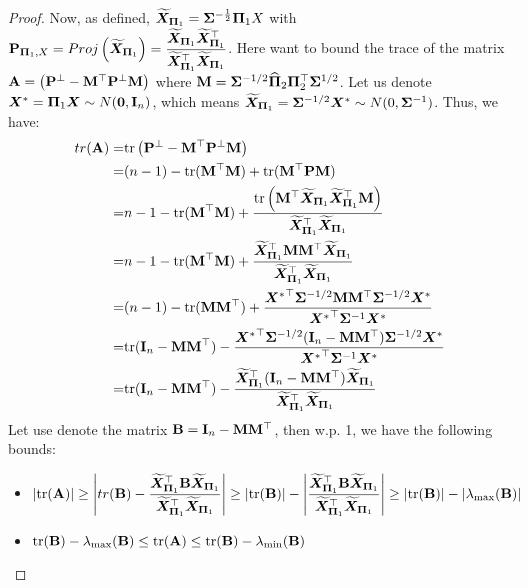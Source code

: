 \documentclass[numsec,webpdf,modern,medium,namedate]{oup-authoring-template}
\theoremstyle{thmstyleone}%
\theoremstyle{thmstyletwo}%
\theoremstyle{thmstylethree}%
\begin{document}
\begin{proof}
Now, as defined, $\widetilde{\bX}_{\bPi_1} = {\bSig}^{-\frac{1}{2}}\bPi_1X$ with $\bP_{\bPi_1, X} = Proj\left(\widetilde{\bX}_{\bPi_1}\right) = \dfrac{\widetilde{\bX}_{\bPi_1}\widetilde{\bX}_{\bPi_1}^\top}{\widetilde{\bX}_{\bPi_1}^\top \widetilde{\bX}_{\bPi_1}}$. Here want to bound the trace of the matrix $\bA = \left(\bP^\perp - \bM^\top \bP^\perp \bM \right)$ where $\bM = {\bSig}^{-1/2} \hatPi_2 {\bPi}_2^\top {\bSig}^{1/2}$. Let us denote $\bX^\ast = \bPi_1\bX\sim N(\bzero,\bI_n)$, which means $\widetilde{\bX}_{\bPi_1} = {\bSig}^{-1/2}\bX^\ast \sim N(0, \Siginv)$. Thus, we have:
\begin{equation*}
    \begin{split}
        tr(\bA) = & \tr\left(\bP^\perp - \bM^\top \bP^\perp \bM \right)\\
        = & (n-1) - \tr(\bM^\top\bM) + \tr(\bM^\top\bP\bM)\\
        = & n-1 - \tr(\bM^\top\bM) +\dfrac{\tr\left(\bM^\top\widetilde{\bX}_{\bPi_1}\widetilde{\bX}_{\bPi_1}^\top \bM\right)}{\widetilde{\bX}_{\bPi_1}^\top \widetilde{\bX}_{\bPi_1}}\\
        = & n-1 - \tr(\bM^\top\bM)+ \dfrac{\widetilde{\bX}_{\bPi_1}^\top \bM \bM^\top\widetilde{\bX}_{\bPi_1}}{\widetilde{\bX}_{\bPi_1}^\top \widetilde{\bX}_{\bPi_1}}\\
        = & (n-1) - \tr(\bM\bM^\top)+ \dfrac{{\bX^\ast}^\top{\bSig}^{-1/2}\bM\bM^\top{\bSig}^{-1/2}\bX^\ast}{{\bX^\ast}^\top \Siginv\bX^\ast}\\
        = & \tr(\bI_n-\bM\bM^\top)- \dfrac{{\bX^\ast}^\top{\bSig}^{-1/2}(\bI_n -\bM\bM^\top){\bSig}^{-1/2}\bX^\ast}{{\bX^\ast}^\top \Siginv\bX^\ast}\\ 
        = & \tr(\bI_n - \bM\bM^\top) - \dfrac{\widetilde{\bX}_{\bPi_1}^\top(\bI_n - \bM\bM^\top)\widetilde{\bX}_{\bPi_1}}{\widetilde{\bX}_{\bPi_1}^\top \widetilde{\bX}_{\bPi_1}}\\
    \end{split}
\end{equation*}
Let use denote the matrix $\bB = \bI_n - \bM\bM^\top$, then w.p. 1, we have the following bounds:
\begin{itemize}
    \item $|\tr(\bA)| \geq \left|tr(\bB) - \dfrac{\widetilde{\bX}_{\bPi_1}^\top \bB\widetilde{\bX}_{\bPi_1}}{\widetilde{\bX}_{\bPi_1}^\top \widetilde{\bX}_{\bPi_1}}\right| \geq |\tr(\bB)| - \left|\dfrac{\widetilde{\bX}_{\bPi_1}^\top \bB\widetilde{\bX}_{\bPi_1}}{\widetilde{\bX}_{\bPi_1}^\top \widetilde{\bX}_{\bPi_1}}\right|\geq |\tr(\bB)| - |\lambda_{\max}(\bB)|$ 
    \item $\tr(\bB) - \lambda_{\max}(\bB)\leq \tr(\bA)\leq \tr(\bB) - \lambda_{\min}(\bB)$
\end{itemize}


\end{proof}
\end{document}

